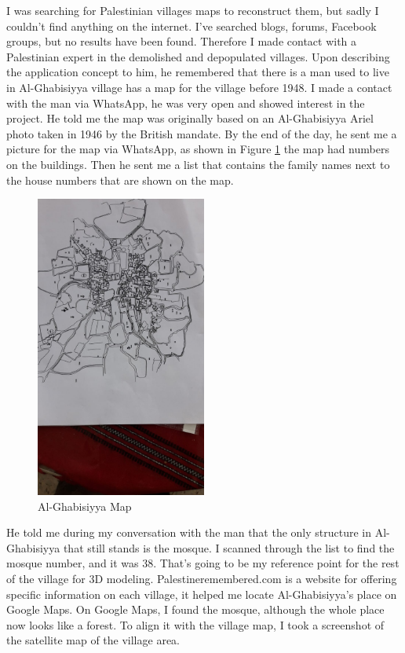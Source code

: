 I was searching for Palestinian villages maps to reconstruct them, but sadly I couldn't find anything on the internet. I've searched blogs, forums, Facebook groups, but no results have been found. Therefore I made contact with a Palestinian expert in the demolished and depopulated villages. Upon describing the application concept to him, he remembered that there is a man used to live in Al-Ghabisiyya village has a map for the village before 1948. I made a contact with the man via WhatsApp, he was very open and showed interest in the project. 
He told me the map was originally based on an Al-Ghabisiyya Ariel photo taken in 1946 by the British mandate. By the end of the day, he sent me a picture for the map via WhatsApp, as shown in Figure \ref{fig:ghmap} the map had numbers on the buildings. Then he sent me a list that contains the family names next to the house numbers that are shown on the map. 
\begin{figure}[ht]
    \centering
    \includegraphics[width=0.50\textwidth, angle=270]{images/ALGHABS_MAP.jpeg}
    \caption{Al-Ghabisiyya Map}
    \label{fig:ghmap}
\end{figure} 
 
He told me during my conversation with the man that the only structure in Al-Ghabisiyya that still stands is the mosque. I scanned through the list to find the mosque number, and it was 38. That's going to be my reference point for the rest of the village for 3D modeling. Palestineremembered.com is a website for offering specific information on each village, it helped me locate Al-Ghabisiyya's place on Google Maps. On Google Maps, I found the mosque, although the whole place now looks like a forest. To align it with the village map, I took a screenshot of the satellite map of the village area.  

